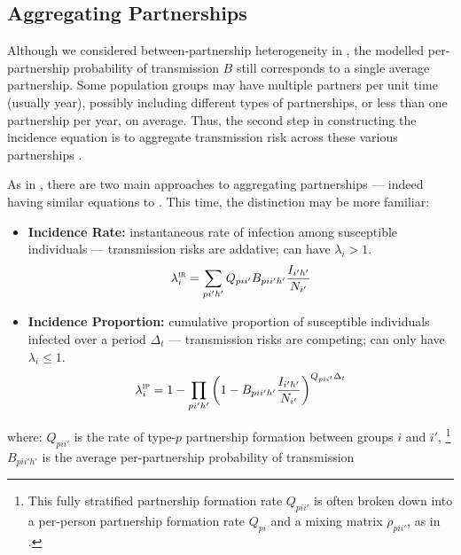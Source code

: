 \subsection{Aggregating Partnerships}\label{foi.prior.part}
Although we considered between-partnership heterogeneity in ,
the modelled per-partnership probability of transmission $B$
still corresponds to a single average partnership.
Some population groups may have multiple partners per unit time (usually year),
possibly including different types of partnerships,
or less than one partnership per year, on average.
Thus, the second step in constructing the incidence equation is to
aggregate transmission risk across these various partnerships \cite{Allard1990}.
\par
As in , there are two main approaches to aggregating partnerships
--- indeed having similar equations to .
This time, the distinction may be more familiar:
\begin{itemize}
  \item \textbf{Incidence Rate:}
  instantaneous rate of infection among susceptible individuals
  --- transmission risks are addative; can have $\lambda_i > 1$.
  \begin{equation}\label{eq:foi.ir}
    \lambda_i^\textsc{ir} = \sum_{pi'h'} Q_{pii'} B_{pii'h'} \frac{{I}_{i'h'}}{N_{i'}}
  \end{equation}
  \item \textbf{Incidence Proportion:}
  cumulative proportion of susceptible individuals infected over a period $\Delta_t$
  --- transmission risks are competing; can only have $\lambda_i \le 1$.
  \begin{equation}\label{eq:foi.ip}
    \lambda_i^\textsc{ip} = 1 - \prod_{pi'h'} {\left(1 - B_{pii'h'} \frac{{I}_{i'h'}}{N_{i'}}\right)}^{Q_{pii'} \Delta_t}
  \end{equation}
\end{itemize}
where:
$Q_{pii'}$ is the rate of type-$p$ partnership formation between groups $i$ and $i'$,%
\footnote{This fully stratified partnership formation rate $Q_{pii'}$ is often broken down into
a per-person partnership formation rate $Q_{pi}$ and a mixing matrix $\rho_{pii'}$,
as in .}
$B_{pii'h'}$ is the average per-partnership probability of transmission
